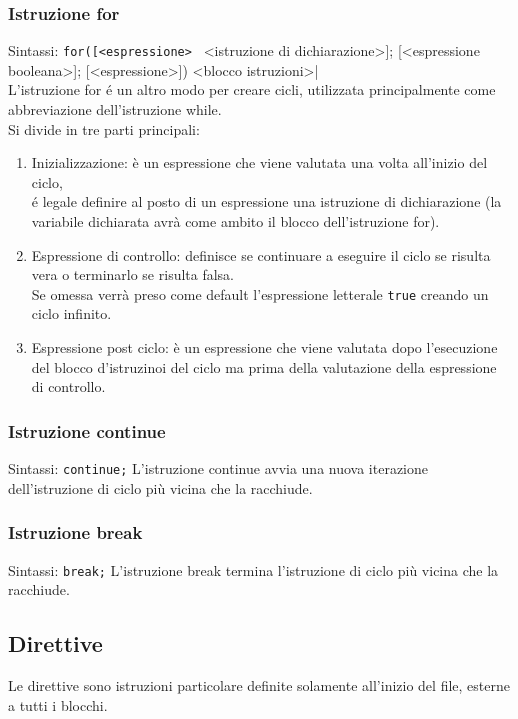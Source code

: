 \subsubsection{Istruzione for}
Sintassi: \lstinline|for([<espressione> | <istruzione di dichiarazione>]; [<espressione booleana>]; [<espressione>]) <blocco istruzioni>| \\
L'istruzione for é un altro modo per creare cicli, utilizzata principalmente come abbreviazione
dell'istruzione while. \\
Si divide in tre parti principali:
\begin{enumerate}
    \item {
        Inizializzazione: è un espressione che viene valutata una volta all'inizio del ciclo, \\
        é legale definire al posto di un espressione una istruzione di dichiarazione
        (la variabile dichiarata avrà come ambito il blocco dell'istruzione for).
    }
    \item { 
        Espressione di controllo: definisce se continuare a eseguire il ciclo se risulta vera 
        o terminarlo se risulta falsa. \\
        Se omessa verrà preso come default l'espressione letterale \lstinline|true| creando un ciclo infinito.
    }
    \item {
        Espressione post ciclo: è un espressione che viene valutata dopo l'esecuzione del blocco d'istruzinoi 
        del ciclo ma prima della valutazione della espressione di controllo.
    }
\end{enumerate}

\subsubsection{Istruzione continue}
Sintassi: \lstinline|continue;|
L'istruzione continue avvia una nuova iterazione dell'istruzione di ciclo più vicina che la racchiude.

\subsubsection{Istruzione break}
Sintassi: \lstinline|break;|
L'istruzione break termina l'istruzione di ciclo più vicina che la racchiude.

\subsection{Direttive}
Le direttive sono istruzioni particolare definite solamente all'inizio del file, esterne a 
tutti i blocchi.

